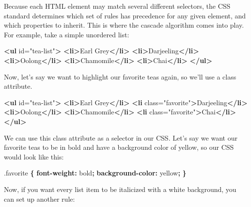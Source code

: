 \documentclass[12pt,]{krantz}
\makeatletter
\newenvironment{Shaded}{\begin{snugshade}}{\end{snugshade}}
\newcommand{\KeywordTok}[1]{\textcolor[rgb]{0.13,0.29,0.53}{\textbf{#1}}}
\newcommand{\DataTypeTok}[1]{\textcolor[rgb]{0.13,0.29,0.53}{#1}}
\newcommand{\FloatTok}[1]{\textcolor[rgb]{0.00,0.00,0.81}{#1}}
\newcommand{\StringTok}[1]{\textcolor[rgb]{0.31,0.60,0.02}{#1}}
\newcommand{\OtherTok}[1]{\textcolor[rgb]{0.56,0.35,0.01}{#1}}
\newcommand{\NormalTok}[1]{#1}
\newenvironment{kframe}{%
\medskip{}
\setlength{\fboxsep}{.8em}
 \def\at@end@of@kframe{}%
 \ifinner\ifhmode%
  \def\at@end@of@kframe{\end{minipage}}%
  \begin{minipage}{\columnwidth}%
 \fi\fi%
 \def\FrameCommand##1{\hskip\@totalleftmargin \hskip-\fboxsep
 \colorbox{shadecolor}{##1}\hskip-\fboxsep
     \hskip-\linewidth \hskip-\@totalleftmargin \hskip\columnwidth}%
 \MakeFramed {\advance\hsize-\width
   \@totalleftmargin\z@ \linewidth\hsize
   \@setminipage}}%
 {\par\unskip\endMakeFramed%
 \at@end@of@kframe}
\renewenvironment{Shaded}{\begin{kframe}}{\end{kframe}}
\theoremstyle{definition}
\theoremstyle{definition}
\theoremstyle{definition}
\theoremstyle{remark}
\makeatother
\begin{document}
Because each HTML element may match several different selectors, the CSS
standard determines which set of rules has precedence for any given
element, and which properties to inherit. This is where the cascade
algorithm comes into play. For example, take a simple unordered list:

\begin{Shaded}
\begin{Highlighting}[]
\KeywordTok{<ul}\OtherTok{ id=}\StringTok{"tea-list"}\KeywordTok{>}
  \KeywordTok{<li>}\NormalTok{Earl Grey}\KeywordTok{</li>}
  \KeywordTok{<li>}\NormalTok{Darjeeling}\KeywordTok{</li>}
  \KeywordTok{<li>}\NormalTok{Oolong}\KeywordTok{</li>}
  \KeywordTok{<li>}\NormalTok{Chamomile}\KeywordTok{</li>}
  \KeywordTok{<li>}\NormalTok{Chai}\KeywordTok{</li>}
\KeywordTok{</ul>}
\end{Highlighting}
\end{Shaded}

Now, let's say we want to highlight our favorite teas again, so we'll
use a class attribute.

\begin{Shaded}
\begin{Highlighting}[]
\KeywordTok{<ul}\OtherTok{ id=}\StringTok{"tea-list"}\KeywordTok{>}
  \KeywordTok{<li>}\NormalTok{Earl Grey}\KeywordTok{</li>}
  \KeywordTok{<li}\OtherTok{ class=}\StringTok{"favorite"}\KeywordTok{>}\NormalTok{Darjeeling}\KeywordTok{</li>}
  \KeywordTok{<li>}\NormalTok{Oolong}\KeywordTok{</li>}
  \KeywordTok{<li>}\NormalTok{Chamomile}\KeywordTok{</li>}
  \KeywordTok{<li}\OtherTok{ class=}\StringTok{"favorite"}\KeywordTok{>}\NormalTok{Chai}\KeywordTok{</li>}
\KeywordTok{</ul>}
\end{Highlighting}
\end{Shaded}

We can use this class attribute as a selector in our CSS. Let's say we
want our favorite teas to be in bold and have a background color of
yellow, so our CSS would look like this:

\begin{Shaded}
\begin{Highlighting}[]
\FloatTok{.favorite} \KeywordTok{\{}
  \KeywordTok{font-weight:} \DataTypeTok{bold}\KeywordTok{;}
  \KeywordTok{background-color:} \DataTypeTok{yellow}\KeywordTok{;}
\KeywordTok{\}}
\end{Highlighting}
\end{Shaded}

Now, if you want every list item to be italicized with a white
background, you can set up another rule:
\end{document}
